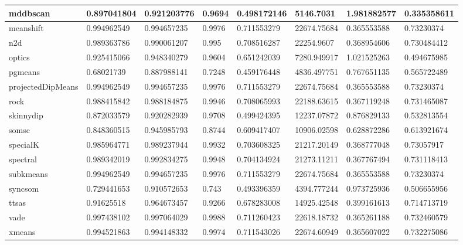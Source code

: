 \begin{table}[H]
\begin{tabular}{|l|l|l|l|l|l|l|l|}
\hline
mddbscan & 0.897041804 & 0.921203776 & 0.9694 & 0.498172146 & 5146.7031 & 1.981882577 & 0.335358611 \\
\hline
meanshift & 0.994962549 & 0.994657235 & 0.9976 & 0.711553279 & 22674.75684 & 0.365553588 & 0.73230374 \\
\hline
n2d & 0.989363786 & 0.990061207 & 0.995 & 0.708516287 & 22254.9607 & 0.368954606 & 0.730484412 \\
\hline
optics & 0.925415066 & 0.948340279 & 0.9604 & 0.651242039 & 7280.949917 & 1.021525263 & 0.494675985 \\
\hline
pgmeans & 0.68021739 & 0.887988141 & 0.7248 & 0.459176448 & 4836.497751 & 0.767651135 & 0.565722489 \\
\hline
projectedDipMeans & 0.994962549 & 0.994657235 & 0.9976 & 0.711553279 & 22674.75684 & 0.365553588 & 0.73230374 \\
\hline
rock & 0.988415842 & 0.988184875 & 0.9946 & 0.708065993 & 22188.63615 & 0.367119248 & 0.731465087 \\
\hline
skinnydip & 0.872033579 & 0.920282939 & 0.9708 & 0.499424395 & 12237.07872 & 0.876829133 & 0.532813554 \\
\hline
somsc & 0.848360515 & 0.945985793 & 0.8744 & 0.609417407 & 10906.02598 & 0.628872286 & 0.613921674 \\
\hline
specialK & 0.985964771 & 0.989237944 & 0.9932 & 0.703608325 & 21217.20149 & 0.368777048 & 0.73057917 \\
\hline
spectral & 0.989342019 & 0.992834275 & 0.9948 & 0.704134924 & 21273.11211 & 0.367767494 & 0.731118413 \\
\hline
subkmeans & 0.994962549 & 0.994657235 & 0.9976 & 0.711553279 & 22674.75684 & 0.365553588 & 0.73230374 \\
\hline
syncsom & 0.729441653 & 0.910572653 & 0.743 & 0.493396359 & 4394.777244 & 0.973725936 & 0.506655956 \\
\hline
ttsas & 0.91625518 & 0.964673457 & 0.9266 & 0.678283008 & 14925.42548 & 0.399161613 & 0.714713719 \\
\hline
vade & 0.997438102 & 0.997064029 & 0.9988 & 0.711260423 & 22618.18732 & 0.365261188 & 0.732460579 \\
\hline
xmeans & 0.994521863 & 0.994148332 & 0.9974 & 0.711543026 & 22674.60949 & 0.365607022 & 0.732275086 \\
\hline
\end{tabular}
\end{table}

\clearpage

